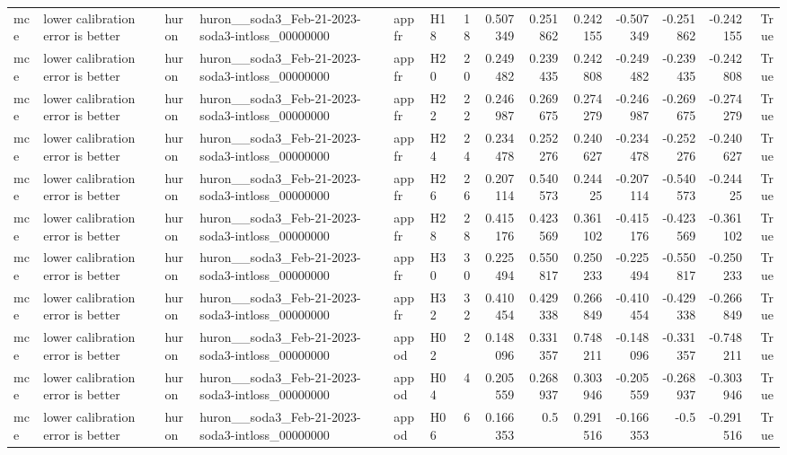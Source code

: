 \begin{longtable}{llllllrrrrrrrr}
mce & lower calibration error is better & huron & huron\_\_soda3\_Feb-21-2023-soda3-intloss\_00000000 & appfr & H18 & 18 & 0.507349 & 0.251862 & 0.242155 & -0.507349 & -0.251862 & -0.242155 & True \\
mce & lower calibration error is better & huron & huron\_\_soda3\_Feb-21-2023-soda3-intloss\_00000000 & appfr & H20 & 20 & 0.249482 & 0.239435 & 0.242808 & -0.249482 & -0.239435 & -0.242808 & True \\
mce & lower calibration error is better & huron & huron\_\_soda3\_Feb-21-2023-soda3-intloss\_00000000 & appfr & H22 & 22 & 0.246987 & 0.269675 & 0.274279 & -0.246987 & -0.269675 & -0.274279 & True \\
mce & lower calibration error is better & huron & huron\_\_soda3\_Feb-21-2023-soda3-intloss\_00000000 & appfr & H24 & 24 & 0.234478 & 0.252276 & 0.240627 & -0.234478 & -0.252276 & -0.240627 & True \\
mce & lower calibration error is better & huron & huron\_\_soda3\_Feb-21-2023-soda3-intloss\_00000000 & appfr & H26 & 26 & 0.207114 & 0.540573 & 0.24425 & -0.207114 & -0.540573 & -0.24425 & True \\
mce & lower calibration error is better & huron & huron\_\_soda3\_Feb-21-2023-soda3-intloss\_00000000 & appfr & H28 & 28 & 0.415176 & 0.423569 & 0.361102 & -0.415176 & -0.423569 & -0.361102 & True \\
mce & lower calibration error is better & huron & huron\_\_soda3\_Feb-21-2023-soda3-intloss\_00000000 & appfr & H30 & 30 & 0.225494 & 0.550817 & 0.250233 & -0.225494 & -0.550817 & -0.250233 & True \\
mce & lower calibration error is better & huron & huron\_\_soda3\_Feb-21-2023-soda3-intloss\_00000000 & appfr & H32 & 32 & 0.410454 & 0.429338 & 0.266849 & -0.410454 & -0.429338 & -0.266849 & True \\
mce & lower calibration error is better & huron & huron\_\_soda3\_Feb-21-2023-soda3-intloss\_00000000 & appod & H02 & 2 & 0.148096 & 0.331357 & 0.748211 & -0.148096 & -0.331357 & -0.748211 & True \\
mce & lower calibration error is better & huron & huron\_\_soda3\_Feb-21-2023-soda3-intloss\_00000000 & appod & H04 & 4 & 0.205559 & 0.268937 & 0.303946 & -0.205559 & -0.268937 & -0.303946 & True \\
mce & lower calibration error is better & huron & huron\_\_soda3\_Feb-21-2023-soda3-intloss\_00000000 & appod & H06 & 6 & 0.166353 & 0.5 & 0.291516 & -0.166353 & -0.5 & -0.291516 & True \\

\end{longtable}
